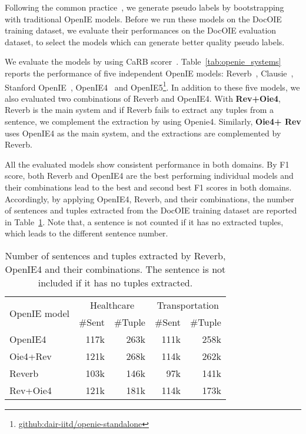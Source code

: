 \documentclass[11pt,a4paper]{article}
\newcommand{\dname}{DocOIE\xspace}
\begin{document}
Following the common practice~\cite{kolluru2020imojie,cui2018neural}, we generate pseudo labels by bootstrapping with traditional OpenIE models. Before we run these models on the \dname training dataset, we evaluate their performances on the \dname evaluation dataset, to select the models which can generate better quality pseudo labels. 

We evaluate the models by using CaRB scorer~\cite{bhardwaj2019carb}.
Table~\ref{tab:openie_systems} reports the performance of five independent OpenIE models: Reverb~\cite{fader2011identifying}, Clausie~\cite{del2013clausie}, Stanford OpenIE~\cite{angeli2015leveraging}, OpenIE4~\cite{mausam2016open} and OpenIE5\footnote{\url{github:dair-iitd/openie-standalone}}.  In addition to these five models, we also evaluated two combinations of Reverb and OpenIE4. With \textbf{Rev+Oie4}, Reverb is the main system and if Reverb fails to extract any tuples from a sentence, we complement the extraction by using Openie4. Similarly, \textbf{Oie4+ Rev} uses  OpenIE4 as the main system, and the extractions are complemented by Reverb. 

All the evaluated models show consistent performance in both domains. By F1 score, both Reverb and OpenIE4 are the best performing individual models and their combinations lead to the best and second best F1 scores in both domains. Accordingly, by applying OpenIE4, Reverb, and their combinations, the number of sentences and tuples extracted from the \dname training dataset are reported in Table~\ref{tab:psedoLabels}. Note that, a sentence is not counted if it has no extracted tuples, which leads to the different sentence number. 

\begin{table}[!t]
\centering
\begin{tabular}{p{1.6cm}|rr|rr}
 \toprule
 \multirow{2}{1.6cm}{\centering OpenIE model} &
  \multicolumn{2}{c|}{Healthcare} &
  \multicolumn{2}{c}{Transportation} \\
 & \multicolumn{1}{c}{\#Sent} & \multicolumn{1}{c|}{\#Tuple} & \multicolumn{1}{c}{\#Sent} & \multicolumn{1}{c}{\#Tuple} \\
 \midrule
  OpenIE4 & 117k & 263k & 111k & 258k\\
  Oie4+Rev & 121k & 268k & 114k & 262k\\
  Reverb & 103k & 146k & 97k & 141k\\
  Rev+Oie4 & 121k & 181k & 114k & 173k\\
  \bottomrule
\end{tabular}
\vspace{-0.5em}
\caption{Number of sentences and tuples extracted by Reverb, OpenIE4 and their combinations. The sentence is not included if it has no tuples extracted.}
\vspace{-1em}
\label{tab:psedoLabels}
\end{table}
\end{document}
